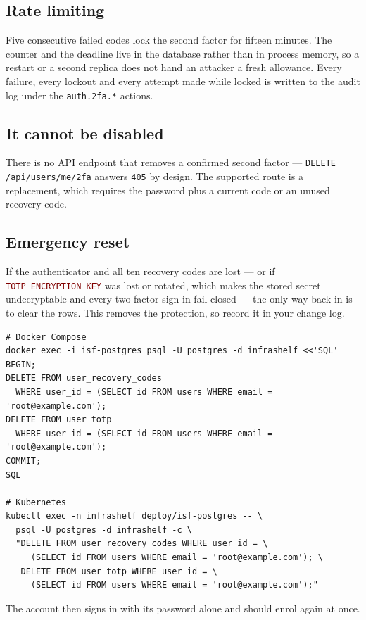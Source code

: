 \documentclass[12pt,a4paper,twoside]{report}
\newcommand{\code}[1]{\texttt{#1}}
\newcommand{\env}[1]{\texttt{\textcolor{Maroon}{#1}}}
\begin{document}
\subsection*{Rate limiting}

Five consecutive failed codes lock the second factor for fifteen minutes. The
counter and the deadline live in the database rather than in process memory, so a
restart or a second replica does not hand an attacker a fresh allowance. Every
failure, every lockout and every attempt made while locked is written to the
audit log under the \code{auth.2fa.*} actions.

\subsection*{It cannot be disabled}

There is no API endpoint that removes a confirmed second factor —
\code{DELETE /api/users/me/2fa} answers \code{405} by design. The supported
route is a replacement, which requires the password plus a current code or an
unused recovery code.

\subsection*{Emergency reset}

If the authenticator and all ten recovery codes are lost — or if
\env{TOTP\_ENCRYPTION\_KEY} was lost or rotated, which makes the stored secret
undecryptable and every two-factor sign-in fail closed — the only way back in is
to clear the rows. This removes the protection, so record it in your change log.

\begin{lstlisting}[style=bash]
# Docker Compose
docker exec -i isf-postgres psql -U postgres -d infrashelf <<'SQL'
BEGIN;
DELETE FROM user_recovery_codes
  WHERE user_id = (SELECT id FROM users WHERE email = 'root@example.com');
DELETE FROM user_totp
  WHERE user_id = (SELECT id FROM users WHERE email = 'root@example.com');
COMMIT;
SQL

# Kubernetes
kubectl exec -n infrashelf deploy/isf-postgres -- \
  psql -U postgres -d infrashelf -c \
  "DELETE FROM user_recovery_codes WHERE user_id = \
     (SELECT id FROM users WHERE email = 'root@example.com'); \
   DELETE FROM user_totp WHERE user_id = \
     (SELECT id FROM users WHERE email = 'root@example.com');"
\end{lstlisting}

The account then signs in with its password alone and should enrol again at once.
\end{document}
